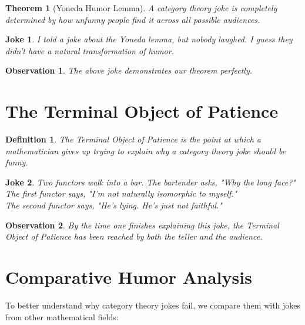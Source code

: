 \documentclass{article}
\newtheorem{theorem}{Theorem}
\newtheorem{joke}{Joke}
\newtheorem{definition}{Definition}
\newtheorem{observation}{Observation}
\begin{document}
\begin{theorem}[Yoneda Humor Lemma]
    A category theory joke is completely determined by how unfunny people find it across all possible audiences.
\end{theorem}

\begin{joke}
    I told a joke about the Yoneda lemma, but nobody laughed. I guess they didn't have a natural transformation of humor.
\end{joke}

\begin{observation}
    The above joke demonstrates our theorem perfectly.
\end{observation}

\section{The Terminal Object of Patience}

\begin{definition}
    The Terminal Object of Patience is the point at which a mathematician gives up trying to explain why a category theory joke should be funny.
\end{definition}

\begin{joke}
    Two functors walk into a bar. The bartender asks, "Why the long face?"\\
    The first functor says, "I'm not naturally isomorphic to myself."\\
    The second functor says, "He's lying. He's just not faithful."\\
    [This joke continues for 17 more lines, explaining increasingly obscure category theory concepts without reaching a punchline]
\end{joke}

\begin{observation}
    By the time one finishes explaining this joke, the Terminal Object of Patience has been reached by both the teller and the audience.
\end{observation}

\section{Comparative Humor Analysis}

To better understand why category theory jokes fail, we compare them with jokes from other mathematical fields:
\end{document}
